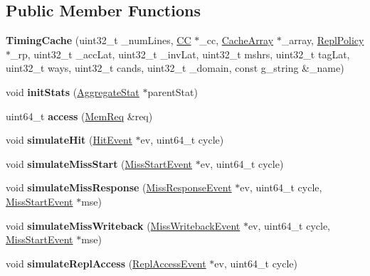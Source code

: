 \subsection*{Public Member Functions}
\begin{DoxyCompactItemize}
\item 
\hypertarget{classTimingCache_a862b430cb85b75ddf4bbb8038f7c15e5}{{\bfseries Timing\-Cache} (uint32\-\_\-t \-\_\-num\-Lines, \hyperlink{classCC}{C\-C} $\ast$\-\_\-cc, \hyperlink{classCacheArray}{Cache\-Array} $\ast$\-\_\-array, \hyperlink{classReplPolicy}{Repl\-Policy} $\ast$\-\_\-rp, uint32\-\_\-t \-\_\-acc\-Lat, uint32\-\_\-t \-\_\-inv\-Lat, uint32\-\_\-t mshrs, uint32\-\_\-t tag\-Lat, uint32\-\_\-t ways, uint32\-\_\-t cands, uint32\-\_\-t \-\_\-domain, const g\-\_\-string \&\-\_\-name)}\label{classTimingCache_a862b430cb85b75ddf4bbb8038f7c15e5}

\item 
\hypertarget{classTimingCache_a9583021c6cd082d567a4b9e7f41ab2f6}{void {\bfseries init\-Stats} (\hyperlink{classAggregateStat}{Aggregate\-Stat} $\ast$parent\-Stat)}\label{classTimingCache_a9583021c6cd082d567a4b9e7f41ab2f6}

\item 
\hypertarget{classTimingCache_abb38c207c0421313352ba62bda3d6ac1}{uint64\-\_\-t {\bfseries access} (\hyperlink{structMemReq}{Mem\-Req} \&req)}\label{classTimingCache_abb38c207c0421313352ba62bda3d6ac1}

\item 
\hypertarget{classTimingCache_ae98f61c668a3cdf2bad116e15af963a0}{void {\bfseries simulate\-Hit} (\hyperlink{classHitEvent}{Hit\-Event} $\ast$ev, uint64\-\_\-t cycle)}\label{classTimingCache_ae98f61c668a3cdf2bad116e15af963a0}

\item 
\hypertarget{classTimingCache_ac32b5bc9d2b3a18e551bba9e3a332242}{void {\bfseries simulate\-Miss\-Start} (\hyperlink{classMissStartEvent}{Miss\-Start\-Event} $\ast$ev, uint64\-\_\-t cycle)}\label{classTimingCache_ac32b5bc9d2b3a18e551bba9e3a332242}

\item 
\hypertarget{classTimingCache_a77a6afaecb3c06558bd36cb0cfee02ac}{void {\bfseries simulate\-Miss\-Response} (\hyperlink{classMissResponseEvent}{Miss\-Response\-Event} $\ast$ev, uint64\-\_\-t cycle, \hyperlink{classMissStartEvent}{Miss\-Start\-Event} $\ast$mse)}\label{classTimingCache_a77a6afaecb3c06558bd36cb0cfee02ac}

\item 
\hypertarget{classTimingCache_a34fb792dcc77dfe79ba6728742748826}{void {\bfseries simulate\-Miss\-Writeback} (\hyperlink{classMissWritebackEvent}{Miss\-Writeback\-Event} $\ast$ev, uint64\-\_\-t cycle, \hyperlink{classMissStartEvent}{Miss\-Start\-Event} $\ast$mse)}\label{classTimingCache_a34fb792dcc77dfe79ba6728742748826}

\item 
\hypertarget{classTimingCache_a7f073cf69fdac72bad8441c8bc5c3d62}{void {\bfseries simulate\-Repl\-Access} (\hyperlink{classReplAccessEvent}{Repl\-Access\-Event} $\ast$ev, uint64\-\_\-t cycle)}\label{classTimingCache_a7f073cf69fdac72bad8441c8bc5c3d62}

\end{DoxyCompactItemize}
